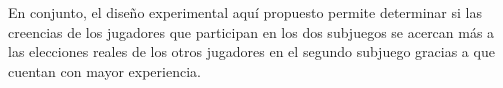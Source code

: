 En conjunto, el diseño experimental aquí propuesto permite determinar si las creencias de los jugadores que participan en los dos subjuegos se acercan más a las elecciones reales de los otros jugadores en el segundo subjuego gracias a que cuentan con mayor experiencia.\\


